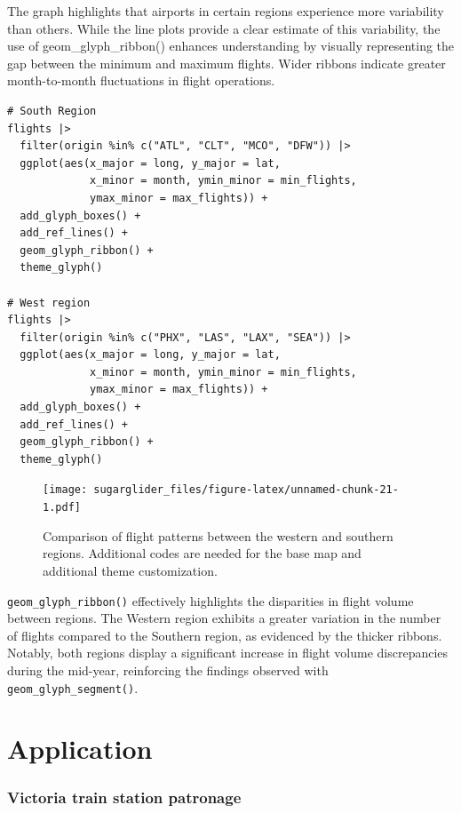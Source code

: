 The graph highlights that airports in certain regions experience more variability than others. While the line plots provide a clear estimate of this variability, the use of geom\_glyph\_ribbon() enhances understanding by visually representing the gap between the minimum and maximum flights. Wider ribbons indicate greater month-to-month fluctuations in flight operations.

\begin{verbatim}
# South Region
flights |> 
  filter(origin %in% c("ATL", "CLT", "MCO", "DFW")) |>
  ggplot(aes(x_major = long, y_major = lat,
             x_minor = month, ymin_minor = min_flights,
             ymax_minor = max_flights)) + 
  add_glyph_boxes() +
  add_ref_lines() +
  geom_glyph_ribbon() +
  theme_glyph()

# West region
flights |> 
  filter(origin %in% c("PHX", "LAS", "LAX", "SEA")) |>
  ggplot(aes(x_major = long, y_major = lat,
             x_minor = month, ymin_minor = min_flights,
             ymax_minor = max_flights)) + 
  add_glyph_boxes() +
  add_ref_lines() +
  geom_glyph_ribbon() +
  theme_glyph()
\end{verbatim}

\begin{figure}
\centering
\texttt{[image: sugarglider\_files/figure-latex/unnamed-chunk-21-1.pdf]}
\caption{\label{fig:unnamed-chunk-21}Comparison of flight patterns between the western and southern regions. Additional codes are needed for the base map and additional theme customization.}
\end{figure}

\texttt{geom\_glyph\_ribbon()} effectively highlights the disparities in flight volume between regions. The Western region exhibits a greater variation in the number of flights compared to the Southern region, as evidenced by the thicker ribbons. Notably, both regions display a significant increase in flight volume discrepancies during the mid-year, reinforcing the findings observed with \texttt{geom\_glyph\_segment()}.

\hypertarget{application}{%
\section{Application}\label{application}}

\hypertarget{victoria-train-station-patronage}{%
\subsubsection{Victoria train station patronage}\label{victoria-train-station-patronage}}

